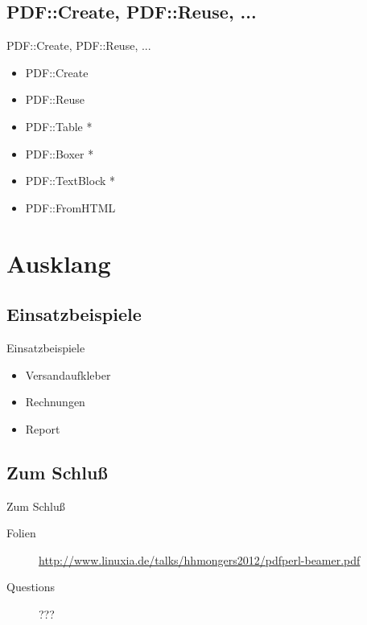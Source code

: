 \subsection{PDF::Create, PDF::Reuse, ...}

\begin{frame}{PDF::Create, PDF::Reuse, ...}
\begin{itemize}
\item PDF::Create
\item PDF::Reuse
\item PDF::Table *
\item PDF::Boxer *
\item PDF::TextBlock *
\item PDF::FromHTML
\end{itemize}
\end{frame}

\section{Ausklang}

\subsection{Einsatzbeispiele}
\begin{frame}{Einsatzbeispiele}
 \begin{itemize}
  \item Versandaufkleber
  \item Rechnungen
  \item Report
  \end{itemize}
\end{frame}

\subsection{Zum Schluß}
\begin{frame}{Zum Schluß}
 \begin{description}
  \item[Folien]
    \url{http://www.linuxia.de/talks/hhmongers2012/pdfperl-beamer.pdf}
   \item[Questions] ???
 \end{description}
\end{frame}



